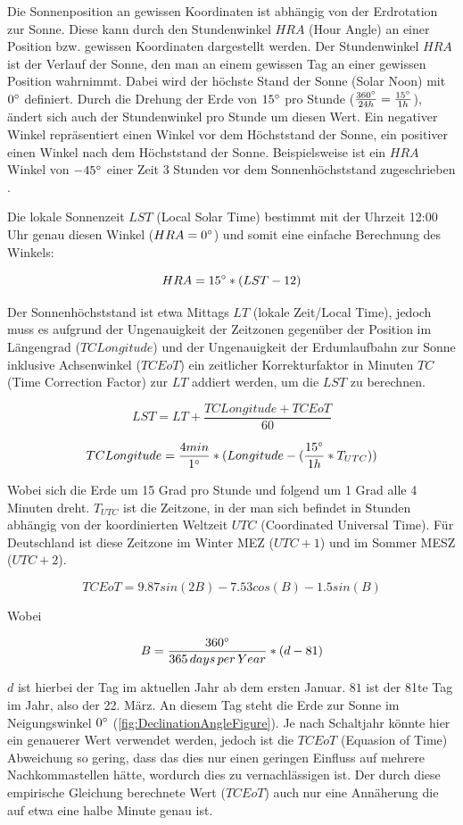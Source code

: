Die Sonnenposition an gewissen Koordinaten ist abhängig von der Erdrotation zur Sonne.
Diese kann durch den Stundenwinkel $HRA$ (Hour Angle) an einer Position bzw. gewissen Koordinaten dargestellt werden.
Der Stundenwinkel $HRA$ ist der Verlauf der Sonne, den man an einem gewissen Tag an einer gewissen Position wahrnimmt.
Dabei wird der höchste Stand der Sonne (Solar Noon) mit $0\degree$ definiert. Durch die Drehung der Erde von $15\degree$ pro Stunde ($\frac{360\degree}{24h} = \frac{15\degree}{1h}$), ändert sich auch der Stundenwinkel pro Stunde um diesen Wert. Ein negativer Winkel repräsentiert einen Winkel vor dem Höchststand der Sonne, ein positiver einen Winkel nach dem Höchststand der Sonne. Beispielsweise ist ein $HRA$ Winkel von $-45\degree$ einer Zeit 3 Stunden vor dem Sonnenhöchststand zugeschrieben \autocite{front:SolarTime}.

Die lokale Sonnenzeit $LST$ (Local Solar Time) bestimmt mit der Uhrzeit 12:00 Uhr genau diesen Winkel ($HRA = 0\degree$) und somit eine einfache Berechnung des Winkels:

\[ HRA = 15\degree*(LST - 12) \]

Der Sonnenhöchststand ist etwa Mittags $LT$ (lokale Zeit/Local Time), jedoch muss es aufgrund der Ungenauigkeit der Zeitzonen gegenüber der Position im Längengrad ($TCLongitude$) und der Ungenauigkeit der Erdumlaufbahn zur Sonne inklusive Achsenwinkel ($TCEoT$) ein zeitlicher Korrekturfaktor in Minuten $TC$ (Time Correction Factor) zur $LT$ addiert werden, um die $LST$ zu berechnen.

\[ LST = LT + \frac{TCLongitude + TCEoT}{60} \]

\[ TCLongitude = \frac{4min}{1\degree}*(Longitude - (\frac{15\degree}{1h} * T_{UTC})) \]

Wobei sich die Erde um 15 Grad pro Stunde und folgend um 1 Grad alle 4 Minuten dreht. $T_{UTC}$ ist die Zeitzone, in der man sich befindet in Stunden abhängig von der koordinierten Weltzeit $UTC$ (Coordinated Universal Time). Für Deutschland ist diese Zeitzone im Winter MEZ ($UTC+1$) und im Sommer MESZ ($UTC+2$).

\[ TCEoT = 9.87sin(2B) - 7.53cos(B) - 1.5sin(B) \]

Wobei

\[ B = \frac{360\degree}{365\,days\,per\,Year}*(d - 81) \]

$d$ ist hierbei der Tag im aktuellen Jahr ab dem ersten Januar. $81$ ist der 81te Tag im Jahr, also der 22. März. An diesem Tag steht die Erde zur Sonne im Neigungswinkel $0\degree$ (\autoref{fig:DeclinationAngleFigure}). Je nach Schaltjahr könnte hier ein genauerer Wert verwendet werden, jedoch ist die $TCEoT$ (Equasion of Time) Abweichung so gering, dass das dies nur einen geringen Einfluss auf mehrere Nachkommastellen hätte, wordurch dies zu vernachlässigen ist. Der durch diese empirische Gleichung berechnete Wert ($TCEoT$) auch nur eine Annäherung die auf etwa eine halbe Minute genau ist.

